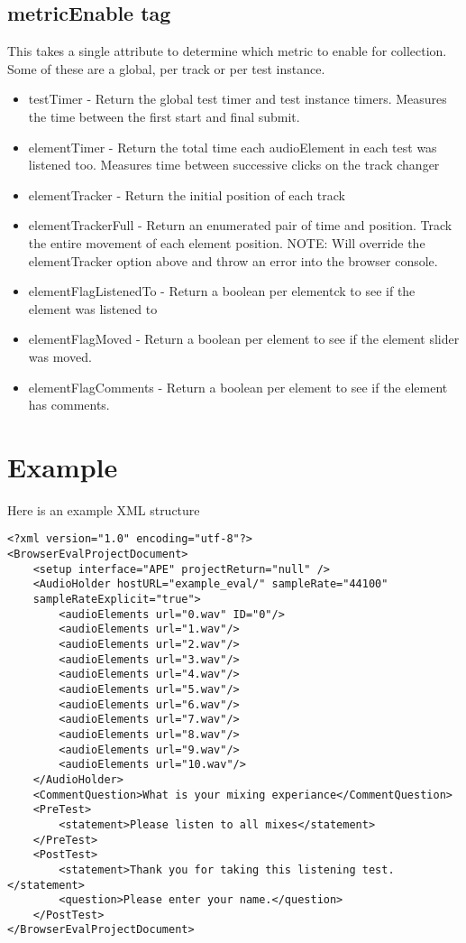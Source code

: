 \documentclass{article}
\begin{document}
\subsection{metricEnable tag}
This takes a single attribute to determine which metric to enable for collection. Some of these are a global, per track or per test instance.
\begin{itemize}
\item testTimer - Return the global test timer and test instance timers. Measures the time between the first start and final submit.
\item elementTimer - Return the total time each audioElement in each test was listened too. Measures time between successive clicks on the track changer
\item elementTracker - Return the initial position of each track
\item elementTrackerFull - Return an enumerated pair of time and position. Track the entire movement of each element position. NOTE: Will override the elementTracker option above and throw an error into the browser console.
\item elementFlagListenedTo - Return a boolean per elementck to see if the element was listened to
\item elementFlagMoved - Return a boolean per element to see if the element slider was moved.
\item elementFlagComments - Return a boolean per element to see if the element has comments.
\end{itemize}

\section{Example}

Here is an example XML structure

\begin{lstlisting}
<?xml version="1.0" encoding="utf-8"?>
<BrowserEvalProjectDocument>
	<setup interface="APE" projectReturn="null" />
	<AudioHolder hostURL="example_eval/" sampleRate="44100"
	sampleRateExplicit="true">
		<audioElements url="0.wav" ID="0"/>
		<audioElements url="1.wav"/>
		<audioElements url="2.wav"/>
		<audioElements url="3.wav"/>
		<audioElements url="4.wav"/>
		<audioElements url="5.wav"/>
		<audioElements url="6.wav"/>
		<audioElements url="7.wav"/>
		<audioElements url="8.wav"/>
		<audioElements url="9.wav"/>
		<audioElements url="10.wav"/>
	</AudioHolder>
	<CommentQuestion>What is your mixing experiance</CommentQuestion>
	<PreTest>
		<statement>Please listen to all mixes</statement>
	</PreTest>
	<PostTest>
		<statement>Thank you for taking this listening test.</statement>
		<question>Please enter your name.</question>
	</PostTest>
</BrowserEvalProjectDocument>
\end{lstlisting}
\end{document}
